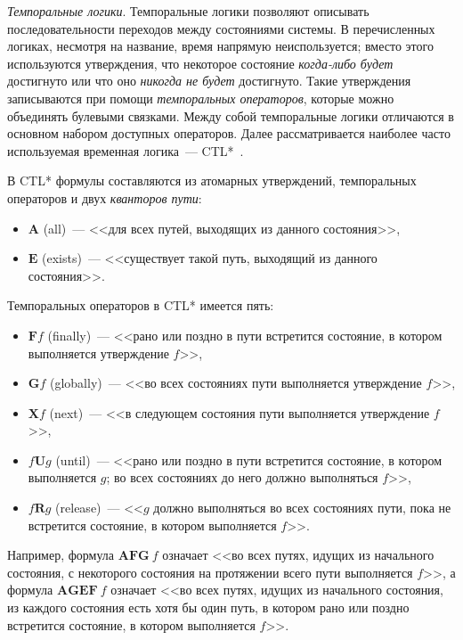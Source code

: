 \documentclass[a4paper,notitlepage,14pt]{article}
\begin{document}
\textit{Темпоральные логики}. Темпоральные логики позволяют описывать последовательности
переходов между состояниями системы. В перечисленных логиках, несмотря на название, время
напрямую неиспользуется; вместо этого используются утверждения, что некоторое состояние
\emph{когда-либо будет} достигнуто или что оно \emph{никогда не будет} достигнуто. Такие
утверждения записываются при помощи \emph{темпоральных операторов}, которые можно
объединять булевыми связками. Между собой темпоральные логики отличаются в основном
набором доступных операторов. Далее рассматривается наиболее часто используемая временная
логика~--- CTL*~\cite{Stirling96modaland}.

В CTL* формулы составляются из атомарных утверждений, темпоральных операторов и
двух \emph{кванторов пути}:

\begin{itemize}
\item $\mathbf{A}$ (all)~--- <<для всех путей, выходящих из данного состояния>>,
\item $\mathbf{E}$ (exists)~--- <<существует такой путь, выходящий из данного состояния>>.
\end{itemize}

Темпоральных операторов в CTL* имеется пять:

\begin{itemize}
\item $\mathbf{F} f$ (finally)~--- <<рано или поздно в пути встретится состояние, в котором
  выполняется утверждение $f$>>,
\item $\mathbf{G} f$ (globally)~--- <<во всех состояниях пути выполняется утверждение
  $f$>>,
\item $\mathbf{X} f$ (next)~--- <<в следующем состояния пути выполняется утверждение
  $f$>>,
\item $f \mathbf{U} g$ (until)~--- <<рано или поздно в пути встретится состояние, в
  котором выполняется $g$; во всех состояниях до него должно выполняться $f$>>,
\item $f \mathbf{R} g$ (release)~--- <<$g$ должно выполняться во всех состояниях пути,
  пока не встретится состояние, в котором выполняется $f$>>.
\end{itemize}

Например, формула $\mathbf{AFG}~ f$ означает <<во всех путях, идущих из начального
состояния, с некоторого состояния на протяжении всего пути выполняется $f$>>, а формула
$\mathbf{AGEF}~ f$ означает <<во всех путях, идущих из начального состояния, из каждого
состояния есть хотя бы один путь, в котором рано или поздно встретится состояние, в
котором выполняется $f$>>.
\end{document}

